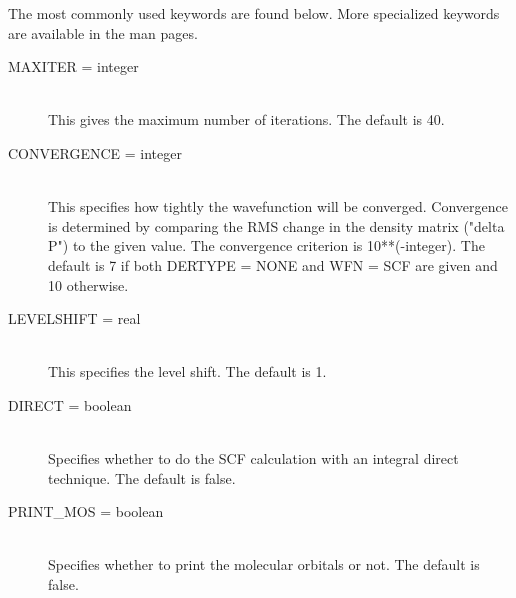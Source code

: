 The most commonly used keywords are found below.  More specialized keywords
are available in the man pages.

\begin{description}
\item[MAXITER = integer]\mbox{}\\
This gives the maximum number of iterations.  The default is 40.
\item[CONVERGENCE = integer]\mbox{}\\
This specifies how tightly the wavefunction will be converged.
Convergence is determined by comparing the RMS change in the
density matrix ("delta P") to the given value.  The convergence
criterion is 10**(-integer).  The default is 7 if both DERTYPE
= NONE and WFN = SCF are given and 10 otherwise.
\item[LEVELSHIFT = real]\mbox{}\\
This specifies the level shift.  The default is 1.
\item[DIRECT = boolean]\mbox{}\\
Specifies whether to do the SCF calculation with an integral direct
technique.  The default is false.
\item[PRINT\_MOS = boolean]\mbox{}\\
Specifies whether to print the molecular orbitals or not.  The default
is false.
\end{description}
